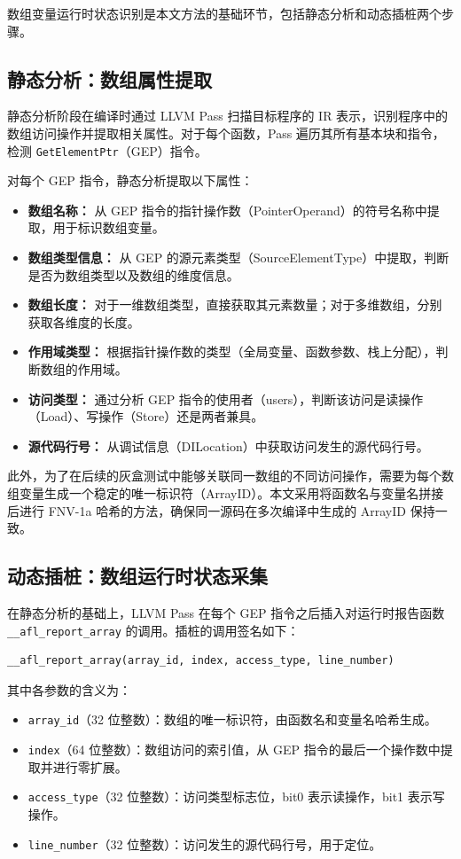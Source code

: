 \documentclass[bachelor]{njupthesis}
\begin{document}
数组变量运行时状态识别是本文方法的基础环节，包括静态分析和动态插桩两个步骤。

\subsection{静态分析：数组属性提取}

静态分析阶段在编译时通过 LLVM Pass 扫描目标程序的 IR 表示，识别程序中的数组访问操作并提取相关属性。对于每个函数，Pass 遍历其所有基本块和指令，检测 \texttt{GetElementPtr}（GEP）指令。

对每个 GEP 指令，静态分析提取以下属性：

\begin{itemize}
    \item \textbf{数组名称：} 从 GEP 指令的指针操作数（PointerOperand）的符号名称中提取，用于标识数组变量。
    \item \textbf{数组类型信息：} 从 GEP 的源元素类型（SourceElementType）中提取，判断是否为数组类型以及数组的维度信息。
    \item \textbf{数组长度：} 对于一维数组类型，直接获取其元素数量；对于多维数组，分别获取各维度的长度。
    \item \textbf{作用域类型：} 根据指针操作数的类型（全局变量、函数参数、栈上分配），判断数组的作用域。
    \item \textbf{访问类型：} 通过分析 GEP 指令的使用者（users），判断该访问是读操作（Load）、写操作（Store）还是两者兼具。
    \item \textbf{源代码行号：} 从调试信息（DILocation）中获取访问发生的源代码行号。
\end{itemize}

此外，为了在后续的灰盒测试中能够关联同一数组的不同访问操作，需要为每个数组变量生成一个稳定的唯一标识符（ArrayID）。本文采用将函数名与变量名拼接后进行 FNV-1a 哈希的方法，确保同一源码在多次编译中生成的 ArrayID 保持一致。

\subsection{动态插桩：数组运行时状态采集}

在静态分析的基础上，LLVM Pass 在每个 GEP 指令之后插入对运行时报告函数 \texttt{\_\_afl\_report\_array} 的调用。插桩的调用签名如下：

\begin{verbatim}
__afl_report_array(array_id, index, access_type, line_number)
\end{verbatim}

其中各参数的含义为：
\begin{itemize}
    \item \texttt{array\_id}（32 位整数）：数组的唯一标识符，由函数名和变量名哈希生成。
    \item \texttt{index}（64 位整数）：数组访问的索引值，从 GEP 指令的最后一个操作数中提取并进行零扩展。
    \item \texttt{access\_type}（32 位整数）：访问类型标志位，bit0 表示读操作，bit1 表示写操作。
    \item \texttt{line\_number}（32 位整数）：访问发生的源代码行号，用于定位。
\end{itemize}
\end{document}
